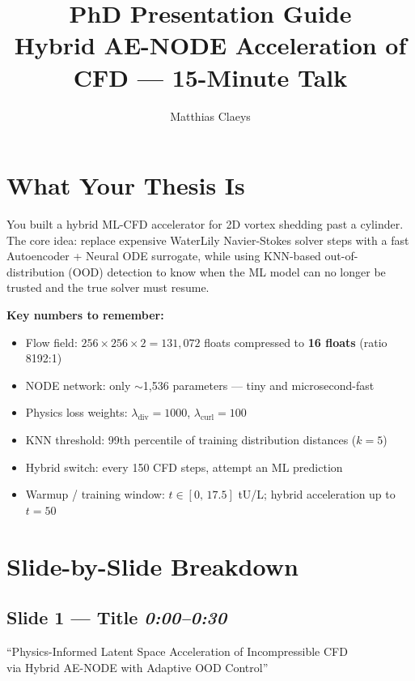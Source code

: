 \documentclass[11pt, a4paper]{article}
\title{\textbf{PhD Presentation Guide}\\
\large Hybrid AE-NODE Acceleration of CFD --- 15-Minute Talk}
\author{Matthias Claeys}
\date{}
\begin{document}
\maketitle

\section*{What Your Thesis Is}

You built a hybrid ML-CFD accelerator for 2D vortex shedding past a cylinder.
The core idea: replace expensive WaterLily Navier-Stokes solver steps with a fast
Autoencoder + Neural ODE surrogate, while using KNN-based out-of-distribution (OOD)
detection to know when the ML model can no longer be trusted and the true solver
must resume.

\textbf{Key numbers to remember:}
\begin{itemize}[noitemsep]
  \item Flow field: $256\times256\times2 = 131{,}072$ floats compressed to \textbf{16 floats} (ratio 8192:1)
  \item NODE network: only $\sim$1,536 parameters --- tiny and microsecond-fast
  \item Physics loss weights: $\lambda_\text{div} = 1000$, $\lambda_\text{curl} = 100$
  \item KNN threshold: 99th percentile of training distribution distances ($k=5$)
  \item Hybrid switch: every 150 CFD steps, attempt an ML prediction
  \item Warmup / training window: $t \in [0,\,17.5]$ tU/L; hybrid acceleration up to $t = 50$
\end{itemize}

\section*{Slide-by-Slide Breakdown}

\subsection*{Slide 1 --- Title \hfill \normalfont\textit{0:00--0:30}}

``Physics-Informed Latent Space Acceleration of Incompressible CFD\\
via Hybrid AE-NODE with Adaptive OOD Control''
\end{document}
